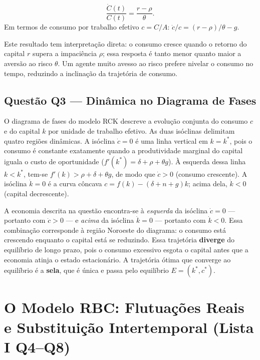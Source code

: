 \documentclass[12pt, a4paper]{article}
\begin{document}
\begin{fatorbox}[title={Equação de Euler (Q2)}]
\[
\frac{\dot{C}(t)}{C(t)} = \frac{r - \rho}{\theta}.
\]
Em termos de consumo por trabalho efetivo $c = C/A$: $\dot{c}/c = (r-\rho)/\theta - g$.
\end{fatorbox}

Este resultado tem interpretação direta: o consumo cresce quando o retorno do capital $r$ supera a impaciência $\rho$; essa resposta é tanto menor quanto maior a aversão ao risco $\theta$. Um agente muito avesso ao risco prefere nivelar o consumo no tempo, reduzindo a inclinação da trajetória de consumo.

\subsection{Questão Q3 --- Dinâmica no Diagrama de Fases}

O diagrama de fases do modelo RCK descreve a evolução conjunta do consumo $c$ e do capital $k$ por unidade de trabalho efetivo. As duas isóclinas delimitam quatro regiões dinâmicas. A isóclina $\dot{c} = 0$ é uma linha vertical em $k = k^*$, pois o consumo é constante exatamente quando a produtividade marginal do capital iguala o custo de oportunidade ($f'(k^*) = \delta + \rho + \theta g$). À esquerda dessa linha $k < k^*$, tem-se $f'(k) > \rho + \delta + \theta g$, de modo que $\dot{c} > 0$ (consumo crescente). A isóclina $\dot{k} = 0$ é a curva côncava $c = f(k) - (\delta+n+g)k$; acima dela, $\dot{k} < 0$ (capital decrescente).

A economia descrita na questão encontra-se à \emph{esquerda} da isóclina $\dot{c} = 0$ — portanto com $\dot{c} > 0$ — e \emph{acima} da isóclina $\dot{k} = 0$ — portanto com $\dot{k} < 0$. Essa combinação corresponde à região Noroeste do diagrama: o consumo está crescendo enquanto o capital está se reduzindo. Essa trajetória \textbf{diverge} do equilíbrio de longo prazo, pois o consumo excessivo esgota o capital antes que a economia atinja o estado estacionário. A trajetória ótima que converge ao equilíbrio é a \textbf{sela}, que é única e passa pelo equilíbrio $E = (k^*, c^*)$.

\section{O Modelo RBC: Flutuações Reais e Substituição Intertemporal (Lista I Q4--Q8)}
\end{document}
